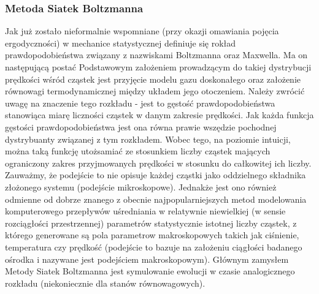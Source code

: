 \documentclass[12pt]{article}
\begin{document}
\subsubsection{Metoda Siatek Boltzmanna}
Jak już zostało nieformalnie wspomniane (przy okazji omawiania pojęcia ergodyczności) w mechanice statystycznej definiuje się rokład prawdopodobieństwa związany z nazwiskami Boltzmanna oraz Maxwella. Ma on następującą postać
Podstawowym założeniem prowadzącym do takiej dystrybucji prędkości wśród cząstek jest przyjęcie modelu gazu doskonałego oraz założenie równowagi termodynamicznej między układem jego otoczeniem. Należy zwrócić uwagę na znaczenie tego rozkładu - jest to gęstość prawdopodobieństwa stanowiąca miarę liczności cząstek w danym zakresie prędkości. Jak każda funkcja gęstości prawdopodobieństwa jest ona równa prawie wszędzie pochodnej dystrybuanty związanej z tym rozkładem. Wobec tego, na poziomie intuicji, można taką funkcję utożsamiać ze stosunkiem liczby cząstek mających ograniczony zakres przyjmowanych prędkości w stosunku do całkowitej ich liczby. Zauważmy, że podejście to nie opisuje każdej cząstki jako oddzielnego składnika złożonego systemu (podejście mikroskopowe). Jednakże jest ono również odmienne od dobrze znanego z obecnie najpopularniejszych metod modelowania komputerowego przepływów uśredniania w relatywnie niewielkiej (w sensie rozciągłości przestrzennej) parametrów statystycznie istotnej liczby cząstek, z którego generowane są pola parametrow makroskopowych takich jak ciśnienie, temperatura czy prędkość (podejście to bazuje na założeniu ciągłości badanego ośrodka i nazywane jest podejściem makroskopowym). Głównym zamysłem Metody Siatek Boltzmanna jest symulowanie ewolucji w czasie analogicznego rozkładu (niekoniecznie dla stanów równowagowych).
\end{document}
